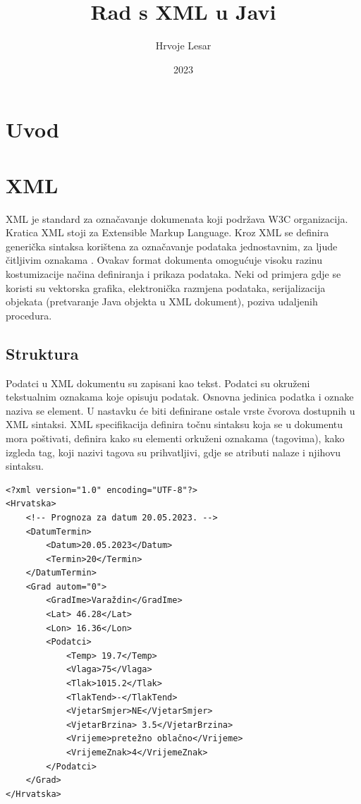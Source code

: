 \documentclass{foi}
\title{Rad s XML u Javi}
\author{Hrvoje Lesar}
\date{2023}
\begin{document}
\maketitle

\tableofcontents

\pagestyle{plain}

\chapter{Uvod}

\chapter{XML}
XML je standard za označavanje dokumenata koji podržava W3C organizacija.
Kratica XML stoji za Extensible Markup Language. Kroz XML se definira generička
sintaksa korištena za označavanje podataka jednostavnim, za ljude čitljivim oznakama \cite{xml_in_a_nutshell}.
Ovakav format dokumenta omogućuje visoku razinu kostumizacije načina definiranja
i prikaza podataka. Neki od primjera gdje se koristi su vektorska grafika,
elektronička razmjena podataka, serijalizacija objekata (pretvaranje Java objekta u XML dokument),
poziva udaljenih procedura.

\section{Struktura}
Podatci u XML dokumentu su zapisani kao tekst. Podatci su okruženi tekstualnim oznakama
koje opisuju podatak. Osnovna jedinica podatka i oznake naziva se element. U nastavku će
biti definirane ostale vrste čvorova dostupnih u XML sintaksi. XML specifikacija definira
točnu sintaksu koja se u dokumentu mora poštivati, definira kako su elementi orkuženi
oznakama (tagovima), kako izgleda tag, koji nazivi tagova su prihvatljivi, gdje se
atributi nalaze i njihovu sintaksu.

\begin{lstlisting}[caption={Vrste čvorova}]
<?xml version="1.0" encoding="UTF-8"?>
<Hrvatska>
    <!-- Prognoza za datum 20.05.2023. -->
    <DatumTermin>
        <Datum>20.05.2023</Datum>
        <Termin>20</Termin>
    </DatumTermin>
    <Grad autom="0">
        <GradIme>Varaždin</GradIme>
        <Lat> 46.28</Lat>
        <Lon> 16.36</Lon>
        <Podatci>
            <Temp> 19.7</Temp>
            <Vlaga>75</Vlaga>
            <Tlak>1015.2</Tlak>
            <TlakTend>-</TlakTend>
            <VjetarSmjer>NE</VjetarSmjer>
            <VjetarBrzina> 3.5</VjetarBrzina>
            <Vrijeme>pretežno oblačno</Vrijeme>
            <VrijemeZnak>4</VrijemeZnak>
        </Podatci>
    </Grad>
</Hrvatska>
\end{lstlisting}
\end{document}
